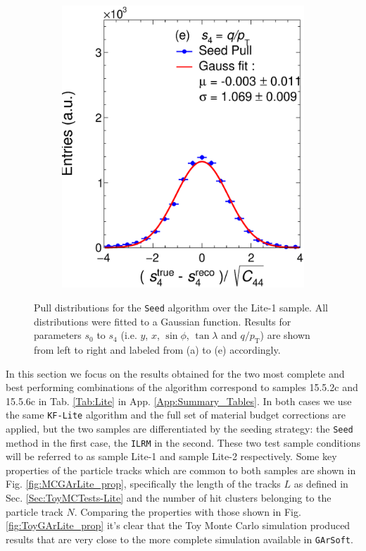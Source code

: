 \begin{figure}[t]
\begin{subfigure}{0.32\textwidth}
         \includegraphics[width=\textwidth]{figures/ch4-KF_NDGArLite/MC/ALICE+KF/UnitSeed_p4.eps}
         \caption{}
         \label{fig:resp4Seed_GArLite_ALICE+KF}
     \end{subfigure}
        \caption[Pull distributions for the \texttt{Seed} algorithm over the Lite-1 sample.]{Pull distributions for the \texttt{Seed} algorithm over the Lite-1 sample. All distributions were fitted to a Gaussian function. Results for parameters $s_0$ to $s_4$ (i.e. $y$, $x$, $\sin\phi$, $\tan\lambda$ and $q/p_{\text{T}}$) are shown from left to right and labeled from (a) to (e) accordingly. }
        \label{fig:MCUnitSeed_GArLite_ALICE+KF}
\end{figure}

In this section we focus on the results obtained for the two most complete and best performing combinations of the algorithm correspond to samples 15.5.2c and 15.5.6c in Tab. \ref{Tab:Lite} in App. \ref{App:Summary_Tables}. In both cases we use the same \texttt{KF-Lite} algorithm and the full set of material budget corrections are applied, but the two samples are differentiated by the seeding strategy: the \texttt{Seed} method in the first case, the \texttt{ILRM} in the second. These two test sample conditions will be referred to as sample Lite-1 and sample Lite-2 respectively. Some key properties of the particle tracks which are common to both samples are shown in Fig. \ref{fig:MCGArLite_prop}, specifically the length of the tracks $L$ as defined in Sec. \ref{Sec:ToyMCTests-Lite} and the number of hit clusters belonging to the particle track $N$. Comparing the properties with those shown in Fig. \ref{fig:ToyGArLite_prop} it's clear that the Toy Monte Carlo simulation produced results that are very close to the more complete simulation available in \texttt{GArSoft}.

